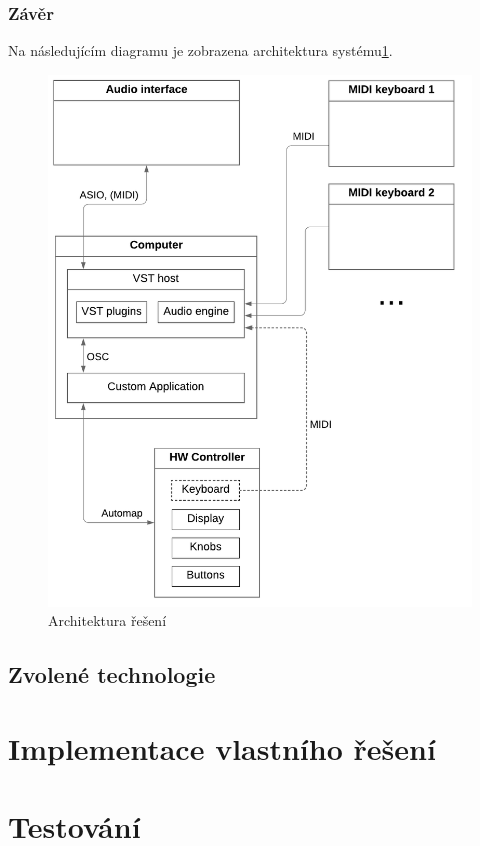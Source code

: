 \documentclass[thesis=M,czech]{FITthesis}[2019/03/06]
\begin{document}
		\subsection{Závěr}
			Na následujícím diagramu je zobrazena architektura systému\ref{fig:Architecture}.
			\begin{figure}[H]
				\centering
				\includegraphics[width=1\textwidth]{Architecture}
				\caption[Architektura řešení]{Architektura řešení}\label{fig:Architecture}
			\end{figure}
\clearpage
	\section{Zvolené technologie}

\chapter{Implementace vlastního řešení}

\chapter{Testování}
\end{document}
